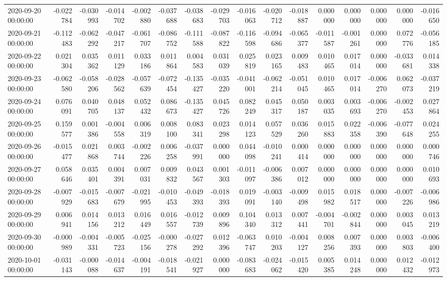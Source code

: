 \begin{tabular}{lrrrrrrrrrrrrrrr}
2020-09-20 00:00:00 & -0.022784 & -0.030993 & -0.014702 & -0.002880 & -0.037688 & -0.038683 & -0.029703 & -0.016063 & -0.020712 & -0.018887 & 0.000000 & 0.000000 & 0.000000 & 0.000000 & -0.016650 \\
2020-09-21 00:00:00 & -0.112483 & -0.062292 & -0.047217 & -0.061707 & -0.086752 & -0.111588 & -0.087822 & -0.116598 & -0.094686 & -0.065377 & -0.011587 & -0.001261 & 0.000000 & 0.072776 & -0.056185 \\
2020-09-22 00:00:00 & 0.021304 & 0.035362 & 0.011129 & 0.033186 & 0.011864 & 0.004583 & 0.031039 & 0.025819 & 0.023165 & 0.009483 & 0.010465 & 0.017014 & 0.000000 & -0.033681 & 0.014338 \\
2020-09-23 00:00:00 & -0.062580 & -0.058206 & -0.028562 & -0.057639 & -0.072454 & -0.135427 & -0.035220 & -0.041001 & -0.062214 & -0.051045 & 0.010465 & 0.017014 & -0.006270 & 0.062073 & -0.037219 \\
2020-09-24 00:00:00 & 0.076091 & 0.040705 & 0.048137 & 0.052432 & 0.086673 & -0.135427 & 0.045726 & 0.082249 & 0.045317 & 0.050187 & 0.003035 & 0.003693 & -0.006270 & -0.002453 & 0.027864 \\
2020-09-25 00:00:00 & 0.159577 & 0.001386 & -0.004558 & 0.006319 & 0.008100 & 0.083341 & 0.023298 & 0.014123 & 0.057529 & 0.036260 & 0.015883 & 0.022358 & -0.006390 & -0.077648 & 0.024255 \\
2020-09-26 00:00:00 & -0.015477 & 0.021868 & 0.003744 & -0.002226 & 0.006258 & -0.037991 & 0.000000 & 0.044098 & -0.010241 & 0.000414 & 0.000000 & 0.000000 & 0.000000 & 0.000000 & 0.000746 \\
2020-09-27 00:00:00 & 0.058646 & 0.035401 & 0.004391 & 0.007031 & 0.009832 & 0.043567 & 0.001303 & -0.011097 & -0.006386 & 0.007012 & 0.000000 & 0.000000 & 0.000000 & 0.000000 & 0.010693 \\
2020-09-28 00:00:00 & -0.007929 & -0.015683 & -0.007679 & -0.021995 & -0.010453 & -0.049393 & -0.018393 & 0.019091 & -0.003140 & -0.009498 & 0.015982 & 0.018517 & 0.000000 & -0.007226 & -0.006986 \\
2020-09-29 00:00:00 & 0.006941 & 0.014156 & 0.013212 & 0.016449 & 0.016557 & -0.012739 & 0.009896 & 0.104340 & 0.013312 & 0.007441 & -0.004701 & -0.002844 & 0.000000 & 0.003045 & 0.013219 \\
2020-09-30 00:00:00 & -0.000989 & -0.004331 & -0.005723 & -0.025156 & -0.000278 & -0.027292 & 0.012396 & -0.063747 & 0.010203 & -0.004127 & 0.008256 & 0.007393 & 0.000000 & 0.003803 & -0.006400 \\
2020-10-01 00:00:00 & -0.031143 & -0.000088 & -0.014637 & -0.004191 & -0.018541 & -0.021927 & 0.000000 & -0.083683 & -0.024062 & -0.015420 & 0.005385 & 0.014248 & 0.000000 & 0.012432 & -0.012973 \\

\end{tabular}
